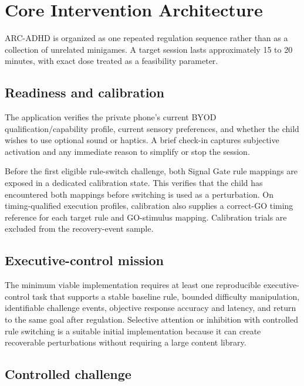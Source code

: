 \section{Core Intervention Architecture}

ARC-ADHD is organized as one repeated regulation sequence rather than as a collection of unrelated minigames. A target session lasts approximately 15 to 20 minutes, with exact dose treated as a feasibility parameter.



\subsection{Readiness and calibration}

The application verifies the private phone's current BYOD qualification/capability profile, current sensory preferences, and whether the child wishes to use optional sound or haptics. A brief check-in captures subjective activation and any immediate reason to simplify or stop the session.

Before the first eligible rule-switch challenge, both Signal Gate rule mappings are exposed in a dedicated calibration state. This verifies that the child has encountered both mappings before switching is used as a perturbation. On timing-qualified execution profiles, calibration also supplies a correct-GO timing reference for each target rule and GO-stimulus mapping. Calibration trials are excluded from the recovery-event sample.

\subsection{Executive-control mission}

The minimum viable implementation requires at least one reproducible executive-control task that supports a stable baseline rule, bounded difficulty manipulation, identifiable challenge events, objective response accuracy and latency, and return to the same goal after regulation. Selective attention or inhibition with controlled rule switching is a suitable initial implementation because it can create recoverable perturbations without requiring a large content library.

\subsection{Controlled challenge}

